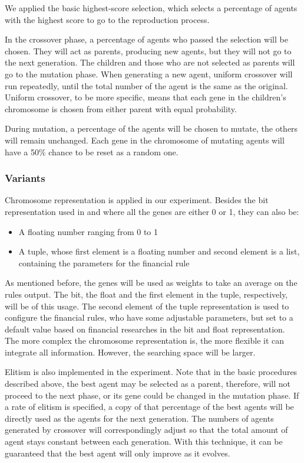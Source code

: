 \documentclass{article}
\begin{document}
We applied the basic highest-score selection,
which selects a percentage of agents with the highest score to go to the reproduction process.

In the crossover phase, a percentage of agents who passed the selection will be chosen.
They will act as parents, producing new agents, but they will not go to the next generation.
The children and those who are not selected as parents will go to the mutation phase.
When generating a new agent, uniform crossover will run repeatedly,
until the total number of the agent is the same as the original.
Uniform crossover, to be more specific, means that each gene in the children's chromosome
is chosen from either parent with equal probability.

During mutation, a percentage of the agents will be chosen to mutate,
the others will remain unchanged.
Each gene in the chromosome of mutating agents will have a 50\% chance to be reset as a random one.

\subsubsection{Variants}\label{subsubsec-variants}

Chromosome representation\cite{genetic-algorithm-review-and-application} is applied in our experiment.
Besides the bit representation used in \cite{genetic-algorithms-for-predicting-the-egyptian-stock-market}
and \cite{stock-timing-using-genetic-algorithms}
where all the genes are either 0 or 1,
they can also be:
\begin{itemize}
    \item A floating number ranging from 0 to 1
    \item A tuple, whose first element is a floating number and second element is a list,
    containing the parameters for the financial rule
\end{itemize}

As mentioned before, the genes will be used as weights to take an average on the rules output.
The bit, the float and the first element in the tuple, respectively, will be of this usage.
The second element of the tuple representation is used to configure the financial rules,
who have some adjustable parameters, but set to a default value based on financial researches
in the bit and float representation.
The more complex the chromosome representation is, the more flexible it can integrate all information.
However, the searching space will be larger.

Elitism is also implemented in the experiment.
Note that in the basic procedures described above,
the best agent may be selected as a parent, therefore, will not proceed to the next phase,
or its gene could be changed in the mutation phase.
If a rate of elitism is specified, a copy of that percentage of the best agents will be directly used
as the agents for the next generation.
The numbers of agents generated by crossover will correspondingly adjust so that the total amount of
agent stays constant between each generation.
With this technique, it can be guaranteed that the best agent will only improve as it evolves.
\end{document}

